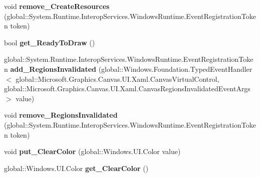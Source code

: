 \begin{DoxyCompactItemize}
void {\bfseries remove\+\_\+\+Create\+Resources} (global\+::\+System.\+Runtime.\+Interop\+Services.\+Windows\+Runtime.\+Event\+Registration\+Token token)
\item 
\mbox{\label{interface_microsoft_1_1_graphics_1_1_canvas_1_1_u_i_1_1_xaml_1_1_i_canvas_virtual_control_ad0524adf9910c3dfd2d10699b71f28d0}} 
bool {\bfseries get\+\_\+\+Ready\+To\+Draw} ()
\item 
\mbox{\label{interface_microsoft_1_1_graphics_1_1_canvas_1_1_u_i_1_1_xaml_1_1_i_canvas_virtual_control_a7d37fb0b34072ecd8bc9f32712ea4cba}} 
global\+::\+System.\+Runtime.\+Interop\+Services.\+Windows\+Runtime.\+Event\+Registration\+Token {\bfseries add\+\_\+\+Regions\+Invalidated} (global\+::\+Windows.\+Foundation.\+Typed\+Event\+Handler$<$ global\+::\+Microsoft.\+Graphics.\+Canvas.\+U\+I.\+Xaml.\+Canvas\+Virtual\+Control, global\+::\+Microsoft.\+Graphics.\+Canvas.\+U\+I.\+Xaml.\+Canvas\+Regions\+Invalidated\+Event\+Args $>$ value)
\item 
\mbox{\label{interface_microsoft_1_1_graphics_1_1_canvas_1_1_u_i_1_1_xaml_1_1_i_canvas_virtual_control_afe949e744dadc9f5e39dfec072c67406}} 
void {\bfseries remove\+\_\+\+Regions\+Invalidated} (global\+::\+System.\+Runtime.\+Interop\+Services.\+Windows\+Runtime.\+Event\+Registration\+Token token)
\item 
\mbox{\label{interface_microsoft_1_1_graphics_1_1_canvas_1_1_u_i_1_1_xaml_1_1_i_canvas_virtual_control_a84b465dc31a0ee833f01ee8a2c9191af}} 
void {\bfseries put\+\_\+\+Clear\+Color} (global\+::\+Windows.\+U\+I.\+Color value)
\item 
\mbox{\label{interface_microsoft_1_1_graphics_1_1_canvas_1_1_u_i_1_1_xaml_1_1_i_canvas_virtual_control_a69a389035bbca3cc303b09429c228178}} 
global\+::\+Windows.\+U\+I.\+Color {\bfseries get\+\_\+\+Clear\+Color} ()
\item 
\mbox{\label{interface_microsoft_1_1_graphics_1_1_canvas_1_1_u_i_1_1_xaml_1_1_i_canvas_virtual_control_a0554619052150d743418f63c5cef0641}} 

\end{DoxyCompactItemize}
